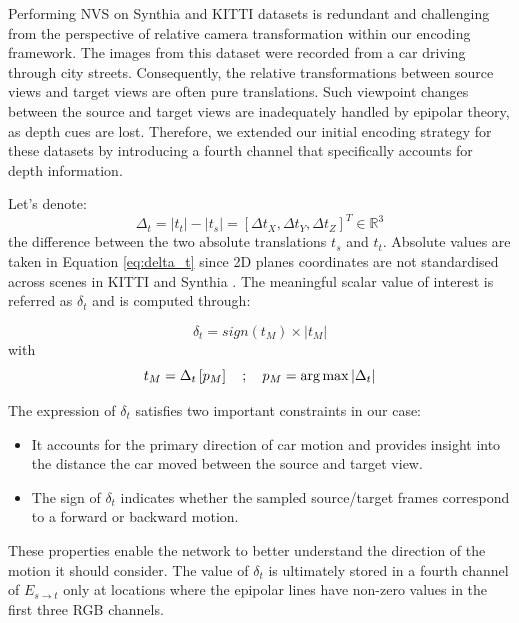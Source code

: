 Performing \ac{NVS} on Synthia \citep{ros2016synthia} and KITTI \citep{geiger2012we} datasets is redundant and challenging from the perspective of relative camera transformation within our encoding framework. The images from this dataset were recorded from a car driving through city streets. Consequently, the relative transformations between source views and target views are often pure translations. Such viewpoint changes between the source and target views are inadequately handled by epipolar theory, as depth cues are lost. Therefore, we extended our initial encoding strategy for these datasets by introducing a fourth channel that specifically accounts for depth information.

Let's denote:
\begin{equation}
    \Delta_{t}= |t_{t}| - |t_{s}| = \left[\Delta t_{X},\Delta t_{Y},\Delta t_{Z} \right]^{T} \in \mathbb{R}^3
    \label{eq:delta_t}
\end{equation}
the difference between the two absolute translations $t_s$ and $t_t$. Absolute values are taken in Equation \eqref{eq:delta_t} since 2D planes coordinates are not standardised across scenes in KITTI \citep{geiger2012we} and Synthia \citep{ros2016synthia}. The meaningful scalar value of interest is referred as $\delta_{t}$ and is computed through:
 
 \begin{equation}
 \label{eq:2}
     \delta_{t} = sign(t_{M}) \times| t_{M} |
 \end{equation}
 with 
 \begin{equation}
    t_{M} = \Delta_{t}\left[p_{M}\right] \quad ; \quad p_{M}= \argmax|\Delta_{t}|
\end{equation}

The expression of $\delta_{t}$ satisfies two important constraints in our case: 

\begin{itemize}
    \item It accounts for the primary direction of car motion and provides insight into the distance the car moved between the source and target view.
    \item The sign of $\delta_{t}$ indicates whether the sampled source/target frames correspond to a forward or backward motion.  
\end{itemize}
These properties enable the network to better understand the direction of the motion it should consider. The value of  $\delta_{t}$ is ultimately stored in a fourth channel of $E_{s\xrightarrow{}t}$ only at locations where the epipolar lines have non-zero values in the first three RGB channels. 

